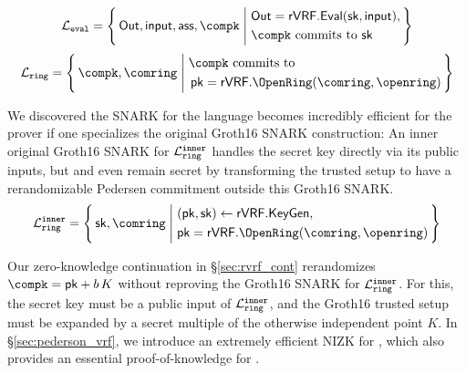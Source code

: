 %
\def\tmpAA{\Out = \rVRF.\Eval(\sk,\msg)}%
\def\tmpBB{\textrm{\compk commits to\ \sk}}%
$$ \Leval = \Setst{ \Out, \msg, \aux, \compk }{
	\eprint{
		\tmpAA, \, \tmpBB
	}{
		\begin{aligned}
			&\tmpAA, \\
			&\tmpBB \\
		\end{aligned}
	}
} $$
\def\tmpAA{\textrm{\compk commits to\ }}%
\def\tmpBB{\rVRF.\OpenRing(\comring,\openring)}%
$$ \Lring = \Setst{ \compk, \comring }{
	\eprint{
		\tmpAA \pk = \tmpBB
	}{
		\begin{aligned}
			&\tmpAA \\
			&\, \pk = \tmpBB \\
		\end{aligned}
	}
} $$

We discovered the SNARK for the language \Lring becomes incredibly efficient for the prover if one specializes
the original Groth16 SNARK construction:  An inner original Groth16 SNARK for $\mathcal{L}_{\mathtt{ring}}^{\mathtt{inner}}$
handles the secret key \sk directly via its public inputs, but
\sk and even \pk remain secret by transforming the trusted setup to have
a rerandomizable Pedersen commitment \compk outside this Groth16 SNARK.
$$ \Lring^\inner = \Setst{ \sk, \comring}{
	\eprint{
		(\pk,\sk) \leftarrow \rVRF.\KeyGen, \, %
		\pk = \rVRF.\OpenRing(\comring,\openring) 
	}{
		\begin{aligned}
			&(\pk,\sk) \leftarrow \rVRF.\KeyGen, \\
			&\pk = \rVRF.\OpenRing(\comring,\openring)  \\      
		\end{aligned}
	}
} $$

Our zero-knowledge continuation in \S\ref{sec:rvrf_cont} rerandomizes
$\compk = \pk + b \, K$ without reproving the Groth16 SNARK for $\mathcal{L}_{\mathtt{ring}}^{\mathtt{inner}}$.
For this, the secret key \sk must be a public input of $\mathcal{L}_{\mathtt{ring}}^{\mathtt{inner}}$, and
the Groth16 trusted setup must be expanded by a secret multiple of
the otherwise independent point $K$.
%
In \S\ref{sec:pederson_vrf}, we introduce an extremely efficient NIZK
for \Leval, which also provides an essential proof-of-knowledge for \compk.


\endinput


Ring VRFs are firstly ring signatures broadly interpreted, in that they
prove an involved public key lies inside some commitment \comring to
the plausible signer set, known as the ring.
Anyone could compute \comring from this set of public keys.
%
At the same time, ring VRFs prove correct output of a PRF keyed by
the signer's actual secret key, and evaluated on a supplied message \msg,
which then links ring VRF signatures on the same \msg.

\smallskip

